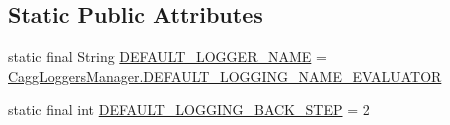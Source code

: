 \subsection*{Static Public Attributes}
\begin{DoxyCompactItemize}
\item 
static final String \hyperlink{classit_1_1emarolab_1_1cagg_1_1core_1_1evaluation_1_1interfacing_1_1EvaluatorBase_3_01G_01extendd61d057930241954f97ab0cbf4992dd1_a53e62cca385dc0c48d7e6994249511e8}{D\-E\-F\-A\-U\-L\-T\-\_\-\-L\-O\-G\-G\-E\-R\-\_\-\-N\-A\-M\-E} = \hyperlink{classit_1_1emarolab_1_1cagg_1_1debugging_1_1CaggLoggersManager_af8668f66339e9fdbd8cbca1d1852b907}{Cagg\-Loggers\-Manager.\-D\-E\-F\-A\-U\-L\-T\-\_\-\-L\-O\-G\-G\-I\-N\-G\-\_\-\-N\-A\-M\-E\-\_\-\-E\-V\-A\-L\-U\-A\-T\-O\-R}
\item 
static final int \hyperlink{classit_1_1emarolab_1_1cagg_1_1core_1_1evaluation_1_1interfacing_1_1EvaluatorBase_3_01G_01extendd61d057930241954f97ab0cbf4992dd1_aa133cf705d63cd4d2f26b08d3ddfdc59}{D\-E\-F\-A\-U\-L\-T\-\_\-\-L\-O\-G\-G\-I\-N\-G\-\_\-\-B\-A\-C\-K\-\_\-\-S\-T\-E\-P} = 2
\end{DoxyCompactItemize}
